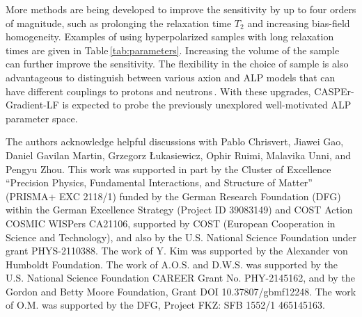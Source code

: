 \documentclass[superscriptaddress,
floatfix,
reprint,
nofootinbib,
amsmath,amssymb,
aps,
prd,
]{revtex4-2}
\begin{document}
More methods are being developed to improve the sensitivity by up to four orders of magnitude, such as prolonging the relaxation time $T_2$ and increasing bias-field homogeneity.
Examples of using hyperpolarized samples with long relaxation times are given in Table\,\ref{tab:parameters}.
Increasing the volume of the sample can further improve the sensitivity.
The flexibility in the choice of sample is also advantageous to distinguish between various axion and ALP models that can have different couplings to protons and neutrons\,\cite{raffelt1999particle}.
With these upgrades, CASPEr-Gradient-LF is expected to probe the previously unexplored well-motivated ALP parameter space.





\begin{acknowledgments}

The authors acknowledge helpful discussions with Pablo Chrisvert, Jiawei Gao, Daniel Gavilan Martin, Grzegorz Łukasiewicz, Ophir Ruimi, Malavika Unni, and Pengyu Zhou. 
This work was supported in part by the Cluster of Excellence ``Precision Physics, Fundamental Interactions, and Structure of Matter'' (PRISMA+ EXC 2118/1) funded by the German Research Foundation (DFG) within the German Excellence Strategy (Project ID 39083149) and COST Action COSMIC WISPers CA21106, supported by COST (European Cooperation in Science and Technology), and also by the U.S. National Science Foundation under grant PHYS-2110388. 
The work of Y. Kim was supported by the Alexander von Humboldt Foundation. 
The work of A.O.S. and D.W.S. was supported by the U.S. National Science Foundation CAREER Grant No. PHY-2145162, and by the Gordon and Betty Moore Foundation, Grant DOI 10.37807/gbmf12248. 
The work of O.M. was supported by the DFG, Project FKZ: SFB 1552/1 465145163.

\end{acknowledgments}


\appendix



\end{document}

